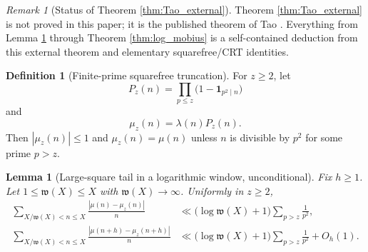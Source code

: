 \documentclass[11pt]{amsart}
\numberwithin{equation}{section}
\theoremstyle{plain}
\newtheorem{lemma}[theorem]{Lemma}
\theoremstyle{definition}
\newtheorem{definition}[theorem]{Definition}
\theoremstyle{remark}
\newtheorem{remark}[theorem]{Remark}
\newcommand{\one}{\mathbf 1}
\newcommand{\mob}{\mu}
\newcommand{\liou}{\lambda}
\newcommand{\what}{\mathfrak w}
\begin{document}
\begin{remark}[Status of Theorem \ref{thm:Tao_external}]
\label{rem:Tao_status}
Theorem \ref{thm:Tao_external} is not proved in this paper; it is the published theorem of Tao \cite{Tao2016}.  Everything from Lemma \ref{lem:truncated_squarefree_tail} through Theorem \ref{thm:log_mobius} is a self-contained deduction from this external theorem and elementary squarefree/CRT identities.
\end{remark}

\begin{definition}[Finite-prime squarefree truncation]
\label{def:mu_z}
For $z\ge2$, let
\begin{equation}
P_z(n)=\prod_{p\le z}\bigl(1-\one_{p^2\mid n}\bigr)
\label{eq:Pz_definition}
\end{equation}
and
\begin{equation}
\mob_z(n)=\liou(n)P_z(n).
\label{eq:mu_z_definition}
\end{equation}
Then $|\mob_z(n)|\le1$ and $\mob_z(n)=\mob(n)$ unless $n$ is divisible by $p^2$ for some prime $p>z$.
\end{definition}

\begin{lemma}[Large-square tail in a logarithmic window, unconditional]
\label{lem:truncated_squarefree_tail}
Fix $h\ge1$.  Let $1\le\what(X)\le X$ with $\what(X)\to\infty$.  Uniformly in $z\ge2$,
\begin{align}
\sum_{X/\what(X)<n\le X}
\frac{|\mob(n)-\mob_z(n)|}{n}
&\ll
\bigl(\log\what(X)+1\bigr)
\sum_{p>z}\frac1{p^2},
\label{eq:mu_tail_unshifted}\\
\sum_{X/\what(X)<n\le X}
\frac{|\mob(n+h)-\mob_z(n+h)|}{n}
&\ll
\bigl(\log\what(X)+1\bigr)
\sum_{p>z}\frac1{p^2}+O_h(1).
\label{eq:mu_tail_shifted}
\end{align}
\end{lemma}
\end{document}

